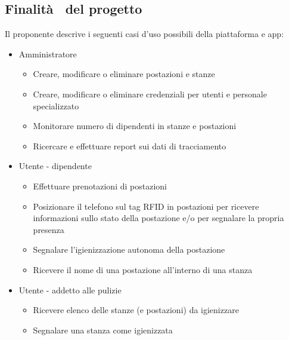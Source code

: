 \subsection{Finalità  del progetto}
Il proponente descrive i seguenti casi d'uso possibili della piattaforma e app:
\begin{itemize}
    \item Amministratore
    \begin{itemize}
        \item Creare, modificare o eliminare postazioni e stanze
        \item Creare, modificare o eliminare credenziali per utenti e personale specializzato
        \item Monitorare numero di dipendenti in stanze e postazioni
        \item Ricercare e effettuare report sui dati di tracciamento
    \end{itemize}
    \item Utente - dipendente
    \begin{itemize}
        \item Effettuare prenotazioni di postazioni
        \item Posizionare il telefono sul tag RFID in postazioni per ricevere informazioni sullo stato della postazione e/o per segnalare la propria presenza
        \item Segnalare l'igienizzazione autonoma della postazione
        \item Ricevere il nome di una postazione all'interno di una stanza
    \end{itemize}
    \item Utente - addetto alle pulizie
    \begin{itemize}
        \item Ricevere elenco delle stanze (e postazioni) da igienizzare
        \item Segnalare una stanza come igienizzata
    \end{itemize}
\end{itemize}
